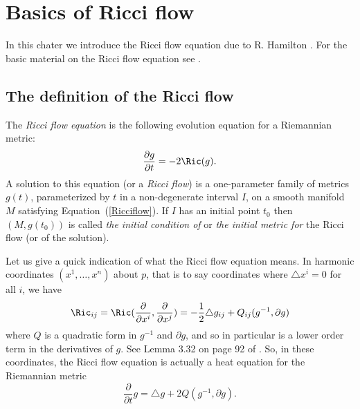 \chapter{Basics of Ricci flow}
\label{chap:flowbasics}
\label{flowbasics}
 In this chater we introduce the Ricci flow equation due to R.
Hamilton \cite{Hamilton3MPRC}. For the basic material on the Ricci flow
equation see \cite{ChowKnopf}.

\section{The definition of the Ricci flow}
\quad
\begin{definition}\label{def:ricci-flow}
The {\em Ricci flow equation} is the
following evolution equation for a Riemannian metric:
\begin{equation}\label{Ricciflow}
\frac{\partial g}{\partial t}= -2\Ric(g). \end{equation} A solution to
this equation (or a {\em Ricci flow}) is a one-parameter
family of metrics $g(t)$, parameterized by $t$ in a non-degenerate interval
$I$, on a smooth manifold $M$ satisfying Equation~(\ref{Ricciflow}). If $I$ has
an initial point $t_0$ then $(M,g(t_0))$ is called  {\sl the initial condition
of} or {\em the initial metric for}  the
Ricci flow (or of the solution).
\end{definition}



Let us give a quick indication of what the Ricci flow equation
means. In harmonic coordinates $(x^1,\ldots,x^n)$ about $p$,
 that is to say coordinates where $\triangle x^i=0$ for all $i$,
we have
\[ \Ric_{ij}=\Ric(\frac{\partial}{\partial x^i},\frac{\partial}{\partial x^j})=
-\frac{1}{2}\triangle g_{ij} + Q_{ij}(g^{-1},\partial g)\]
where $Q$ is a quadratic form in $g^{-1}$ and $\partial g$, and so in particular is a lower order term
in the derivatives of $g$. See Lemma 3.32 on page 92 of \cite{ChowKnopf}.
So, in these coordinates, the Ricci flow equation is actually a heat
equation  for the Riemannian metric
\[ \frac{\partial}{\partial t}g =
\triangle g +2Q(g^{-1},\partial g). \]

